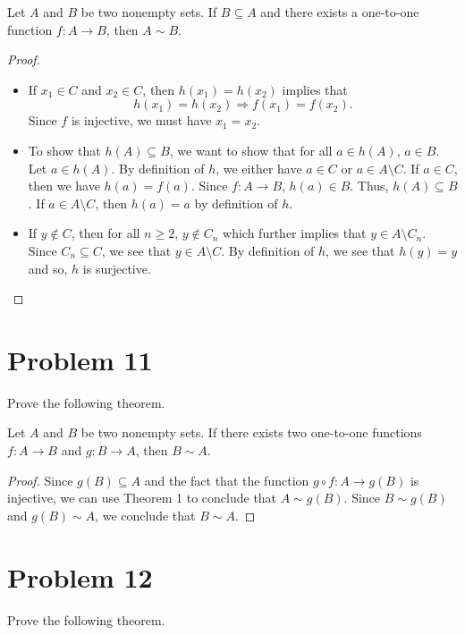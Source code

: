 \documentclass[11pt,a4paper]{article}
\begin{document}
\begin{theorem}[ ]
    Let \( A  \) and \( B  \) be two nonempty sets. If \( B \subseteq A  \) and there exists a one-to-one function \( f: A \to B  \), then \( A \sim B  \).
\end{theorem}
\begin{proof}
\begin{itemize}
    \item If \( {x}_{1} \in C  \) and \( {x}_{2} \in C  \), then \( h({x}_{1}) = h({x}_{2})   \) implies that  
        \[  h({x}_{1}) = h({x}_{2}) \Longrightarrow f({x}_{1}) = f({x}_{2}). \]
        Since \( f \) is injective, we must have \( {x}_{1} = {x}_{2} \).
    \item To show that \( h(A) \subseteq B  \), we want to show that for all \( a \in h(A)  \), \( a  \in B \). Let \( a \in h(A) \). By definition of \( h  \), we either have \( a \in C  \) or \( a \in A \setminus  C  \). If \( a \in C  \), then we have \( h(a) = f(a) \). Since \( f: A \to B   \), \( h(a) \in  B \). Thus, \( h(A) \subseteq B  \). If \( a \in A \setminus  C  \), then \( h(a) = a  \) by definition of \( h  \).         
    \item If \( y \notin C  \), then for all \( n \geq 2  \), \( y \notin {C}_{n} \) which further implies that \( y \in A \setminus  {C}_{n} \). Since \( {C}_{n} \subseteq  C  \), we see that \( y \in A \setminus  C \). By definition of \( h  \), we see that \( h(y) = y  \) and so, \( h  \) is surjective.
\end{itemize}
\end{proof}

\section{Problem 11} Prove the following theorem.
\begin{theorem}
    Let \( A  \) and \( B  \) be two nonempty sets. If there exists two one-to-one functions \( f: A \to B  \) and \( g: B \to A  \), then \( B \sim A  \).
\end{theorem}
\begin{proof}
Since \( g(B) \subseteq  A  \) and the fact that the function \( g \circ f : A \to g(B)  \) is injective, we can use Theorem 1 to conclude that \( A \sim g(B) \). Since \( B \sim g(B) \) and \( g(B) \sim A  \), we conclude that \( B \sim A  \).
\end{proof}

\section*{Problem 12} Prove the following theorem.
\end{document}
